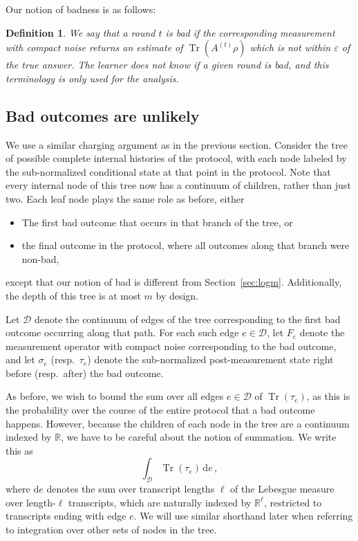 \documentclass[10pt]{article}
\renewcommand{\epsilon}{\varepsilon}
\DeclareMathOperator{\Tr}{Tr}
\newtheorem{definition}[theorem]{Definition}
\newcommand{\sitan}[1]{{\color{red}[sitan: #1]}}
\renewcommand{\sitan}[1]{}
\begin{document}
\noindent Our notion of badness is as follows:

\begin{definition}
    We say that a round $t$ is \emph{bad} if the corresponding measurement with compact noise returns an estimate of $\Tr(A^{(t)}\rho)$ which is not within $\epsilon$ of the true answer. The learner does not know if a given round is bad, and this terminology is only used for the analysis.
\end{definition}

\subsection{Bad outcomes are unlikely}

We use a similar charging argument as in the previous section. Consider the tree of possible complete internal histories of the protocol, with each node labeled by the sub-normalized conditional state at that point in the protocol. Note that every internal node of this tree now has a continuum of children, rather than just two. Each leaf node plays the same role as before, either
\begin{itemize}
    \item The first bad outcome that occurs in that branch of the tree, or
    \item the final outcome in the protocol, where all outcomes along that branch were non-bad,
\end{itemize}
except that our notion of bad is different from Section~\ref{sec:logm}.
Additionally, the depth of this tree is at most $m$ by design.

Let $\mathcal{D}$ denote the continuum of edges of the tree corresponding to the first bad outcome occurring along that path. For each such edge $e\in\mathcal{D}$, let $F_e$ denote the measurement operator with compact noise corresponding to the bad outcome, and let $\sigma_e$ (resp.\ $\tau_e$) denote the sub-normalized post-measurement state right before (resp.\ after) the bad outcome.

As before, we wish to bound the sum over all edges $e\in\mathcal{D}$ of $\Tr(\tau_e)$, as this is the probability over the course of the entire protocol that a bad outcome happens. However, because the children of each node in the tree are a continuum indexed by $\mathbb{R}$, we have to be careful about the notion of summation. We write this as
\begin{equation}
    \int_{\mathcal{D}} \Tr(\tau_e)\,\mathrm{d}e\,,
\end{equation}
where $\mathrm{d}e$ denotes the sum over transcript lengths $\ell$ of the Lebesgue measure over length-$\ell$ transcripts, which are naturally indexed by $\mathbb{R}^\ell$, restricted to transcripts ending with edge $e$. We will use similar shorthand later when referring to integration over other sets of nodes in the tree.
\end{document}
